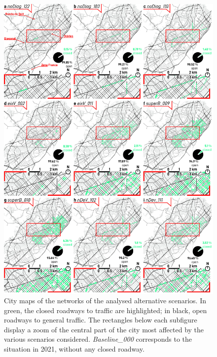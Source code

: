 \begin{figure}[htbp!]
    \centering
    \includegraphics[width=1\textwidth]{LCBM_fig_map_01.jpg}
    \captionsetup{font=scriptsize}
    \caption{City maps of the networks of the analysed alternative scenarios. In green, the closed roadways to traffic are highlighted; in black,  open roadways to general traffic. The rectangles below each subfigure display a zoom of the central part of the city most affected by the various scenarios considered. \emph{Baseline\_000} corresponds to the situation in 2021, without any closed roadway.}
   \label{fig:LCBM_fig_map_01}
\end{figure}

